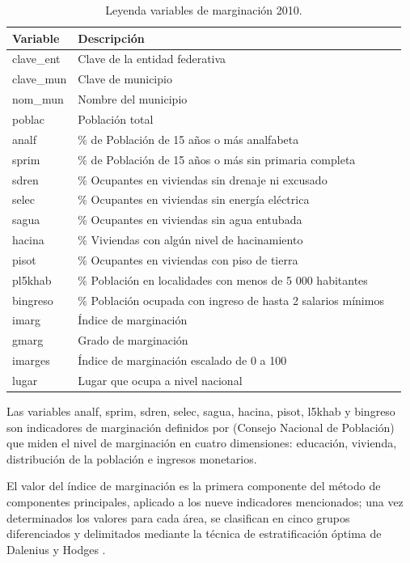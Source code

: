 \begin{table}
\caption[Descripción de la base de datos]
            {Leyenda variables de marginación 2010.}
\label{descripvar}
\begin{tabular}{l p{10cm} r}
\hline
Variable & Descripción \\
\hline 
clave\_ent & Clave de la entidad federativa  \\	
clave\_mun & Clave de municipio	\\
nom\_mun	& Nombre del municipio \\
poblac & Población total \\
analf & \% de Población de 15 años o más analfabeta  \\ 
sprim & \%  de Población de 15 años o más sin primaria completa  \\ 
sdren  & \% Ocupantes en viviendas sin drenaje ni excusado  \\ 
selec & \% Ocupantes en viviendas sin energía eléctrica  \\ 
sagua & \% Ocupantes en viviendas sin agua entubada  \\ 
hacina & \% Viviendas con algún nivel de hacinamiento \\ 
pisot & \% Ocupantes en viviendas con piso de tierra  \\ 
pl5khab & \% Población en localidades con menos de 5 000 habitantes  \\ 
bingreso & \% Población ocupada con ingreso de hasta 2 salarios mínimos \\ 
imarg & Índice de marginación  \\ 
gmarg & Grado de marginación  \\ 
imarges & Índice de marginación escalado de 0 a 100  \\
lugar & Lugar que ocupa a nivel nacional \\
\hline 
\end{tabular} 
\end{table}

Las variables analf, sprim, sdren, selec, sagua, hacina, pisot, l5khab y bingreso son indicadores de marginación definidos por \citet{conapo04} (Consejo Nacional de Población) que miden el nivel de marginación en cuatro dimensiones: educación, vivienda, distribución de la población e ingresos monetarios. 

El valor del índice de marginación es la primera componente del método de componentes principales, aplicado a los nueve indicadores mencionados; una vez determinados los
valores para cada área, se clasifican en cinco grupos diferenciados y delimitados mediante la técnica de estratificación óptima de Dalenius y Hodges \citep{conapo11}.

